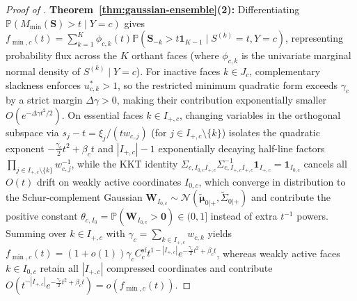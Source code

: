 \documentclass[10pt]{article}
\theoremstyle{plain}
\theoremstyle{definition}
\theoremstyle{remark}
\newcommand{\Prob}{\mathbb{P}}
\begin{document}
\begin{proof}[Proof of ]
\textbf{Theorem~\ref{thm:gaussian-ensemble}(2):} Differentiating $\Prob(M_{\min}(\mathbf{S}) > t \mid Y=c)$ gives $f_{\min, c}(t) = \sum_{k=1}^K \phi_{c,k}(t)\Prob(\mathbf{S}_{-k} > t\mathbf{1}_{K-1} \mid S^{(k)}=t, Y=c)$, representing probability flux across the $K$ orthant faces (where $\phi_{c,k}$ is the univariate marginal normal density of $S^{(k)} \mid Y=c$). For inactive faces $k \in J_c$, complementary slackness enforces $u_{c,k}^* > 1$, so the restricted minimum quadratic form exceeds $\gamma_c$ by a strict margin $\Delta\gamma > 0$, making their contribution exponentially smaller $O(e^{-\Delta\gamma t^2/2})$. On essential faces $k \in I_{+,c}$, changing variables in the orthogonal subspace via $s_j - t = \xi_j / (t w_{c,j})$ (for $j \in I_{+,c} \setminus \{k\}$) isolates the quadratic exponent $-\frac{\gamma_c}{2}t^2 + \beta_c t$ and $|I_{+,c}|-1$ exponentially decaying half-line factors $\prod_{j \in I_{+,c}\setminus\{k\}} w_{c,j}^{-1}$, while the KKT identity $\Sigma_{c, I_{0,c}I_{+,c}}\Sigma_{c, I_{+,c}I_{+,c}}^{-1}\mathbf{1}_{I_{+,c}} = \mathbf{1}_{I_{0,c}}$ cancels all $O(t)$ drift on weakly active coordinates $I_{0,c}$, which converge in distribution to the Schur-complement Gaussian $\mathbf{W}_{I_{0,c}} \sim \mathcal{N}(\tilde{\boldsymbol{\mu}}_{0|+},\tilde{\Sigma}_{0|+})$ and contribute the positive constant $\theta_{c,I_0} = \Prob(\mathbf{W}_{I_{0,c}} > \mathbf{0}) \in (0, 1]$ instead of extra $t^{-1}$ powers. Summing over $k \in I_{+,c}$ with $\gamma_c = \sum_{k\in I_{+,c}} w_{c,k}$ yields $f_{\min,c}(t) = (1+o(1))\gamma_c C_c^{\mathrm{sf}} t^{1-|I_{+,c}|}e^{-\frac{\gamma_c}{2}t^2+\beta_c t}$, whereas weakly active faces $k \in I_{0,c}$ retain all $|I_{+,c}|$ compressed coordinates and contribute $O(t^{-|I_{+,c}|}e^{-\frac{\gamma_c}{2}t^2+\beta_c t}) = o(f_{\min,c}(t))$.


\end{proof}
\end{document}
